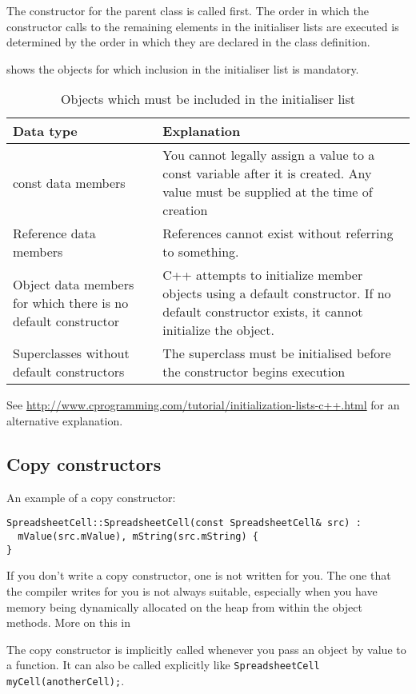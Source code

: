 \documentclass[a4paper,12pt,oneside]{book}
\begin{document}
The constructor for the parent class is called first. The order in which the constructor calls to the remaining elements in the initialiser lists are executed is determined by the order in which they are declared in the class definition.

 shows the objects for which inclusion in the initialiser list is mandatory.
\begin{table}
  \centering
  \begin{tabulary}{\textwidth}{|L|L|}
    \hline
    {\bf Data type} & {\bf Explanation} \\ \hline
    const data members & You cannot legally assign a value to a const variable after it is created. Any value must be supplied at the time of creation \\ \hline
    Reference data members & References cannot exist without referring to something. \\ \hline
    Object data members for which there is no default constructor & C++ attempts to initialize member objects using a default constructor. If no default constructor exists, it cannot initialize the object. \\ \hline
    Superclasses without default constructors & The superclass must be initialised before the constructor begins execution \\ \hline
  \end{tabulary}
  \caption{Objects which must be included in the initialiser list}
  \label{tab:initialiserMandatory}
\end{table}

See {\footnotesize\url{http://www.cprogramming.com/tutorial/initialization-lists-c++.html}} for an alternative explanation.

\subsection{Copy constructors}
An example of a copy constructor:
\begin{lstlisting}
SpreadsheetCell::SpreadsheetCell(const SpreadsheetCell& src) :
  mValue(src.mValue), mString(src.mString) {
}
\end{lstlisting}
If you don't write a copy constructor, one is not written for you. The one that the compiler writes for you is not always suitable, especially when you have memory being dynamically allocated on the heap from within the object methods. More on this in %

The copy constructor is implicitly called whenever you pass an object by value to a function. It can also be called explicitly like \lstinline|SpreadsheetCell myCell(anotherCell);|.
\end{document}
